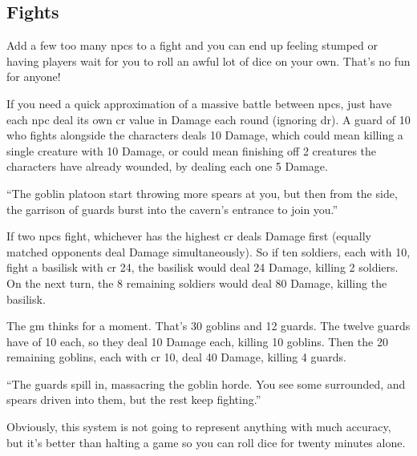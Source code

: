 \begin{multicols}{2}
\subsection{ Fights}
\label{npcfights}

Add a few too many \glspl{npc} to a fight and you can end up feeling stumped or having players wait for you to roll an awful lot of dice on your own.
That's no fun for anyone!

If you need a quick approximation of a massive battle between \glspl{npc}, just have each \gls{npc} deal its own \gls{cr} value in Damage each round (ignoring \gls{dr}).
A guard  of 10 who fights alongside the characters deals 10 Damage, which could mean killing a single creature with 10 Damage, or could mean finishing off 2 creatures the characters have already wounded, by dealing each one 5 Damage.

\begin{exampletext}

  ``The goblin platoon start throwing more spears at you, but then from the side, the garrison of guards burst into the cavern's entrance to join you.''

\end{exampletext}

If two \glspl{npc} fight, whichever has the highest \gls{cr} deals Damage first (equally matched opponents deal Damage simultaneously).
So if ten soldiers, each with  10, fight a basilisk with \gls{cr} 24, the basilisk would deal 24 Damage, killing 2 soldiers.
On the next turn, the 8 remaining soldiers would deal 80 Damage, killing the basilisk.

\begin{exampletext}

  The \gls{gm} thinks for a moment.
  That's 30 goblins and 12 guards.
  The twelve guards have  of 10 each, so they deal 10 Damage each, killing 10 goblins.
  Then the 20 remaining goblins, each with \gls{cr} 10, deal 40 Damage, killing 4 guards.

  ``The guards spill in, massacring the goblin horde.
  You see some surrounded, and spears driven into them, but the rest keep fighting.''

\end{exampletext}

Obviously, this system is not going to represent anything with much accuracy, but it's better than halting a game so you can roll dice for twenty minutes alone.


\end{multicols}
